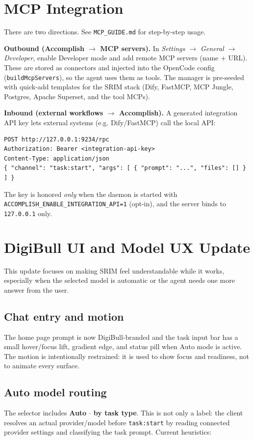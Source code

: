 \documentclass[11pt,a4paper]{article}
\begin{document}
\section{MCP Integration}\label{sec:mcp}
There are two directions. See \verb|MCP_GUIDE.md| for step-by-step usage.

\textbf{Outbound (Accomplish $\rightarrow$ MCP servers).} In
\emph{Settings $\rightarrow$ General $\rightarrow$ Developer}, enable Developer
mode and add remote MCP servers (name + URL). These are stored as connectors and
injected into the OpenCode config (\verb|buildMcpServers|), so the agent uses
them as tools. The manager is pre-seeded with quick-add templates for the SRIM
stack (Dify, FastMCP, MCP Jungle, Postgres, Apache Superset, and the tool MCPs).

\textbf{Inbound (external workflows $\rightarrow$ Accomplish).} A generated
integration API key lets external systems (e.g. Dify/FastMCP) call the local API:
\begin{lstlisting}
POST http://127.0.0.1:9234/rpc
Authorization: Bearer <integration-api-key>
Content-Type: application/json
{ "channel": "task:start", "args": [ { "prompt": "...", "files": [] } ] }
\end{lstlisting}
The key is honored \emph{only} when the daemon is started with
\verb|ACCOMPLISH_ENABLE_INTEGRATION_API=1| (opt-in), and the server binds to
\verb|127.0.0.1| only.

\section{DigiBull UI and Model UX Update}
This update focuses on making SRIM feel understandable while it works, especially
when the selected model is automatic or the agent needs one more answer from the
user.

\subsection{Chat entry and motion}
The home page prompt is now DigiBull-branded and the task input bar has a small
hover/focus lift, gradient edge, and status pill when Auto mode is active. The
motion is intentionally restrained: it is used to show focus and readiness, not
to animate every surface.

\subsection{Auto model routing}
The selector includes \textbf{Auto $\cdot$ by task type}. This is not only a
label: the client resolves an actual provider/model before \verb|task:start| by
reading connected provider settings and classifying the task prompt. Current
heuristics:
\end{document}
